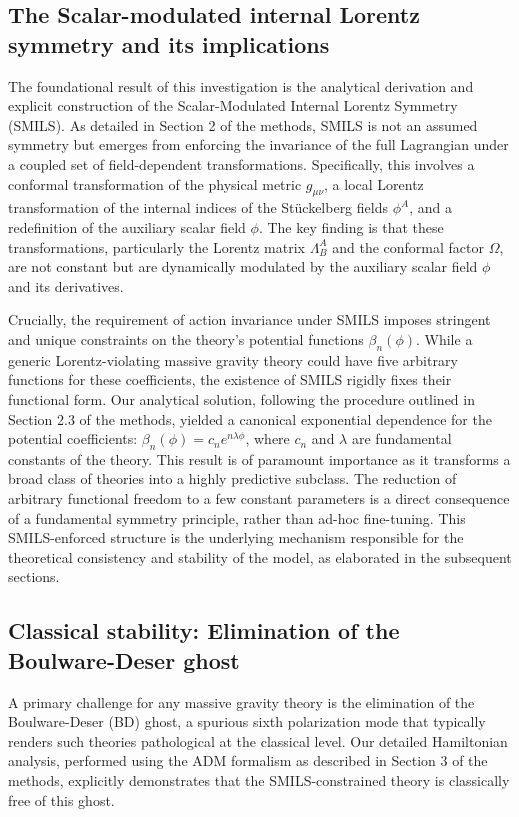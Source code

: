 \documentclass[twocolumn]{aastex631}
\begin{document}
\subsection{The Scalar-modulated internal Lorentz symmetry and its implications}
The foundational result of this investigation is the analytical derivation and explicit construction of the Scalar-Modulated Internal Lorentz Symmetry (SMILS). As detailed in Section 2 of the methods, SMILS is not an assumed symmetry but emerges from enforcing the invariance of the full Lagrangian under a coupled set of field-dependent transformations. Specifically, this involves a conformal transformation of the physical metric $g_{\mu\nu}$, a local Lorentz transformation of the internal indices of the Stückelberg fields $\phi^A$, and a redefinition of the auxiliary scalar field $\phi$. The key finding is that these transformations, particularly the Lorentz matrix $\Lambda^A_B$ and the conformal factor $\Omega$, are not constant but are dynamically modulated by the auxiliary scalar field $\phi$ and its derivatives.

Crucially, the requirement of action invariance under SMILS imposes stringent and unique constraints on the theory's potential functions $\beta_n(\phi)$. While a generic Lorentz-violating massive gravity theory could have five arbitrary functions for these coefficients, the existence of SMILS rigidly fixes their functional form. Our analytical solution, following the procedure outlined in Section 2.3 of the methods, yielded a canonical exponential dependence for the potential coefficients: $\beta_n(\phi) = c_n e^{n\lambda\phi}$, where $c_n$ and $\lambda$ are fundamental constants of the theory. This result is of paramount importance as it transforms a broad class of theories into a highly predictive subclass. The reduction of arbitrary functional freedom to a few constant parameters is a direct consequence of a fundamental symmetry principle, rather than ad-hoc fine-tuning. This SMILS-enforced structure is the underlying mechanism responsible for the theoretical consistency and stability of the model, as elaborated in the subsequent sections.

\subsection{Classical stability: Elimination of the Boulware-Deser ghost}
A primary challenge for any massive gravity theory is the elimination of the Boulware-Deser (BD) ghost, a spurious sixth polarization mode that typically renders such theories pathological at the classical level. Our detailed Hamiltonian analysis, performed using the ADM formalism as described in Section 3 of the methods, explicitly demonstrates that the SMILS-constrained theory is classically free of this ghost.
\end{document}
